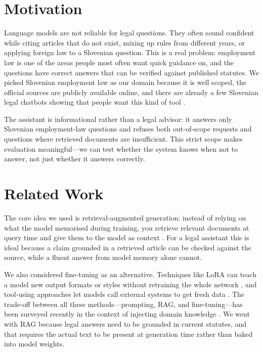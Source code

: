 \documentclass[fleqn,moreauthors,10pt]{ds_report}
\affiliation{\textit{Advisors: Slavko Žitnik, Aleš Žagar}}
\begin{document}
\flushbottom
\maketitle
\thispagestyle{empty}

\section*{Motivation}

Language models are not reliable for legal questions.
They often sound confident while citing articles that do not exist, mixing up rules from different years, or applying foreign law to a Slovenian question.
This is a real problem: employment law is one of the areas people most often want quick guidance on, and the questions have correct answers that can be verified against published statutes.
We picked Slovenian employment law as our domain because it is well scoped, the official sources are publicly available online, and there are already a few Slovenian legal chatbots showing that people want this kind of tool \cite{Pravko,MojMaliPravnik}.

The assistant is informational rather than a legal advisor: it answers only Slovenian employment-law questions and refuses both out-of-scope requests and questions where retrieved documents are insufficient.
This strict scope makes evaluation meaningful---we can test whether the system knows when not to answer, not just whether it answers correctly.

\section*{Related Work}

The core idea we used is retrieval-augmented generation: instead of relying on what the model memorised during training, you retrieve relevant documents at query time and give them to the model as context \cite{Lewis2020RAG}.
For a legal assistant this is ideal because a claim grounded in a retrieved article can be checked against the source, while a fluent answer from model memory alone cannot.

We also considered fine-tuning as an alternative.
Techniques like LoRA can teach a model new output formats or styles without retraining the whole network \cite{Hu2021LoRA}, and tool-using approaches let models call external systems to get fresh data \cite{Schick2023Toolformer}.
The trade-off between all these methods---prompting, RAG, and fine-tuning---has been surveyed recently in the context of injecting domain knowledge \cite{Song2025Injection}.
We went with RAG because legal answers need to be grounded in current statutes, and that requires the actual text to be present at generation time rather than baked into model weights.
\end{document}
